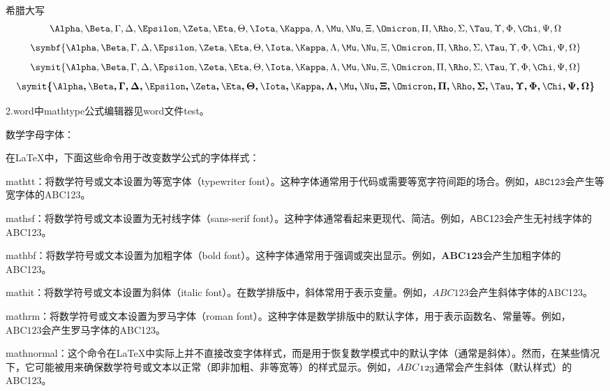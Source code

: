 \documentclass{article}
\begin{document}
希腊大写
\begin{equation}
  \Alpha, \Beta, \Gamma, \Delta, \Epsilon, \Zeta, \Eta, \Theta, \Iota, \Kappa, \Lambda, \Mu, \Nu, \Xi, \Omicron, \Pi, \Rho, \Sigma, \Tau, \Upsilon, \Phi, \Chi, \Psi, \Omega
\end{equation}
\begin{equation}
  \symbf{\Alpha, \Beta, \Gamma, \Delta, \Epsilon, \Zeta, \Eta, \Theta, \Iota, \Kappa, \Lambda, \Mu, \Nu, \Xi, \Omicron, \Pi, \Rho, \Sigma, \Tau, \Upsilon, \Phi, \Chi, \Psi, \Omega}
\end{equation}
\begin{equation}
  \symit{\Alpha, \Beta, \Gamma, \Delta, \Epsilon, \Zeta, \Eta, \Theta, \Iota, \Kappa, \Lambda, \Mu, \Nu, \Xi, \Omicron, \Pi, \Rho, \Sigma, \Tau, \Upsilon, \Phi, \Chi, \Psi, \Omega}
\end{equation}
\begin{equation}
  \boldsymbol{\symit{\Alpha, \Beta, \Gamma, \Delta, \Epsilon, \Zeta, \Eta, \Theta, \Iota, \Kappa, \Lambda, \Mu, \Nu, \Xi, \Omicron, \Pi, \Rho, \Sigma, \Tau, \Upsilon, \Phi, \Chi, \Psi, \Omega}} %
\end{equation}

2.word中mathtype公式编辑器见word文件test。

数学字母字体：

在LaTeX中，下面这些命令用于改变数学公式的字体样式：

‌mathtt‌：将数学符号或文本设置为等宽字体（typewriter font）。这种字体通常用于代码或需要等宽字符间距的场合。例如，$\mathtt{ABC123}$会产生等宽字体的ABC123。

‌mathsf‌：将数学符号或文本设置为无衬线字体（sans-serif font）。这种字体通常看起来更现代、简洁。例如，$\mathsf{ABC123}$会产生无衬线字体的ABC123。

‌mathbf‌：将数学符号或文本设置为加粗字体（bold font）。这种字体通常用于强调或突出显示。例如，$\mathbf{ABC123}$会产生加粗字体的ABC123。

‌mathit‌：将数学符号或文本设置为斜体（italic font）。在数学排版中，斜体常用于表示变量。例如，$\mathit{ABC123}$会产生斜体字体的ABC123。

‌mathrm‌：将数学符号或文本设置为罗马字体（roman font）。这种字体是数学排版中的默认字体，用于表示函数名、常量等。例如，$\mathrm{ABC123}$会产生罗马字体的ABC123。

‌mathnormal‌：这个命令在LaTeX中实际上并不直接改变字体样式，而是用于恢复数学模式中的默认字体（通常是斜体）。然而，在某些情况下，它可能被用来确保数学符号或文本以正常（即非加粗、非等宽等）的样式显示。例如，$\mathnormal{ABC123}$通常会产生斜体（默认样式）的ABC123。
\end{document}
